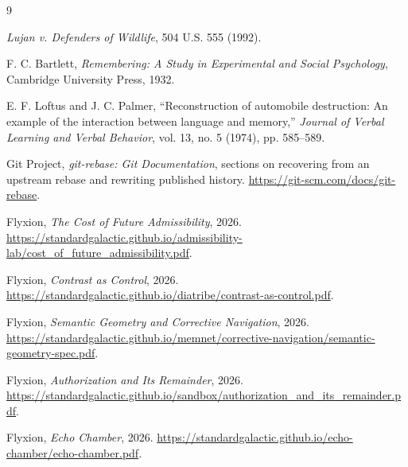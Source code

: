 \documentclass[11pt]{article}
\theoremstyle{remark}
\begin{document}
\begin{thebibliography}{9}

\emph{Lujan v. Defenders of Wildlife},
504 U.S. 555 (1992).

F. C. Bartlett,
\emph{Remembering: A Study in Experimental and Social Psychology},
Cambridge University Press, 1932.

E. F. Loftus and J. C. Palmer,
``Reconstruction of automobile destruction:
An example of the interaction between language and memory,''
\emph{Journal of Verbal Learning and Verbal Behavior},
vol. 13, no. 5 (1974), pp. 585--589.

Git Project,
\emph{git-rebase: Git Documentation},
sections on recovering from an upstream rebase
and rewriting published history.
\url{https://git-scm.com/docs/git-rebase}.

Flyxion,
\emph{The Cost of Future Admissibility},
2026.
\url{https://standardgalactic.github.io/admissibility-lab/cost_of_future_admissibility.pdf}.

Flyxion,
\emph{Contrast as Control},
2026.
\url{https://standardgalactic.github.io/diatribe/contrast-as-control.pdf}.

Flyxion,
\emph{Semantic Geometry and Corrective Navigation},
2026.
\url{https://standardgalactic.github.io/memnet/corrective-navigation/semantic-geometry-spec.pdf}.

Flyxion,
\emph{Authorization and Its Remainder},
2026.
\url{https://standardgalactic.github.io/sandbox/authorization_and_its_remainder.pdf}.

Flyxion,
\emph{Echo Chamber},
2026.
\url{https://standardgalactic.github.io/echo-chamber/echo-chamber.pdf}.

\end{thebibliography}
\end{document}
